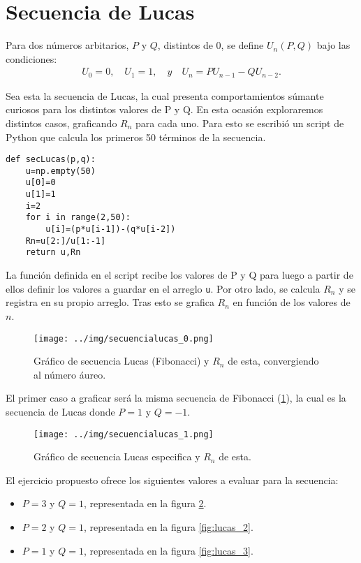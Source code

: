 \documentclass[../portafolio.tex]{subfiles}
\begin{document}
\section{Secuencia de Lucas}

Para dos números arbitarios, $P$ y $Q$, distintos de 0, se define $U_n (P,Q)$ bajo las condiciones:
\begin{align*}
U_0=0,\quad U_1=1, \quad y \quad U_n =PU_{n-1}-QU_{n-2}.
\end{align*}

Sea esta la secuencia de Lucas, la cual presenta comportamientos súmante curiosos para los distintos valores de P y Q. En esta ocasión exploraremos distintos casos, graficando $R_n$ para cada uno. Para esto se escribió un script de Python que calcula los primeros 50 términos de la secuencia.

\begin{verbatim}
def secLucas(p,q):
    u=np.empty(50)
    u[0]=0
    u[1]=1
    i=2
    for i in range(2,50):
        u[i]=(p*u[i-1])-(q*u[i-2])
    Rn=u[2:]/u[1:-1]
    return u,Rn
\end{verbatim}

La función definida en el script recibe los valores de P y Q para luego a partir de ellos definir los valores a guardar en el arreglo \texttt{u}. Por otro lado, se calcula $R_n$ y se registra en su propio arreglo. Tras esto se grafica $R_n$ en función de los valores de $n$.

\begin{figure}
\centering
\texttt{[image: ../img/secuencialucas\_0.png]} 
\caption{Gráfico de secuencia Lucas (Fibonacci) y $R_n$ de esta, convergiendo al número áureo.}\label{fig:lucas_0}
\end{figure}

El primer caso a graficar será la misma secuencia de Fibonacci (\ref{fig:lucas_0}), la cual es la secuencia de Lucas donde $P=1$ y $Q=-1$.

\begin{figure}
\centering
\texttt{[image: ../img/secuencialucas\_1.png]} 
\caption{Gráfico de secuencia Lucas especifica y $R_n$ de esta.}\label{fig:lucas_1}
\end{figure}

El ejercicio propuesto ofrece los siguientes valores a evaluar para la secuencia:

\begin{itemize}
\item $P=3$ y $Q=1$, representada en la figura \ref{fig:lucas_1}.
\item $P=2$ y $Q=1$, representada en la figura \ref{fig:lucas_2}.
\item $P=1$ y $Q=1$, representada en la figura \ref{fig:lucas_3}.
\end{itemize}
\end{document}
